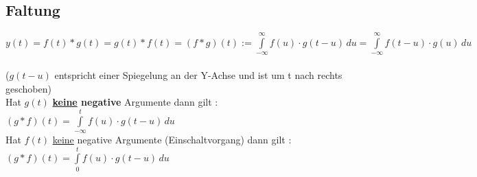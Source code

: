 %
	
	\subsection{Faltung }
	$y(t) = f(t)\ast g(t) = g(t) \ast f(t) = \boxed{ (f \ast g)(t) :=
	\int\limits_{-\infty}^\infty f(u) \cdot g(t-u) \, du} =
	\int\limits_{-\infty}^\infty f(t-u) \cdot g(u)\,du $ \\
	\\
	($g(t-u)$ entspricht einer Spiegelung an der Y-Achse und ist um t nach rechts geschoben)\\
	
	Hat $g\left(t\right)$ \textbf{\underline{keine} negative} Argumente dann gilt :
	$\left(g \ast f \right)\left(t\right)=\int\limits_{-\infty}^t f(u) \cdot
	g(t-u)\,du$\\
	Hat $f\left(t\right)$ \underline{keine} negative Argumente (Einschaltvorgang) dann gilt :
	$\left(g \ast f \right)\left(t\right)=\int\limits_{0}^t f(u) \cdot
	g(t-u)\,du$\\
	
